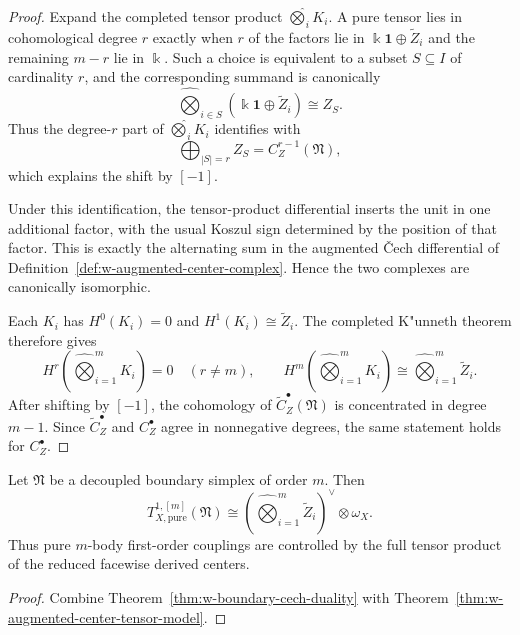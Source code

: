 \begin{proof}
Expand the completed tensor product $\widehat\bigotimes_i K_i$.  A pure tensor lies in cohomological
degree $r$ exactly when $r$ of the factors lie in $\Bbbk\mathbf{1}\oplus \widetilde Z_i$ and the remaining
$m-r$ lie in $\Bbbk$.  Such a choice is equivalent to a subset $S\subseteq I$ of cardinality $r$, and the
corresponding summand is canonically
\[
\widehat\bigotimes_{i\in S}(\Bbbk\mathbf{1}\oplus \widetilde Z_i)
\cong Z_S.
\]
Thus the degree-$r$ part of $\widehat\bigotimes_i K_i$ identifies with
\[
\bigoplus_{|S|=r} Z_S = C_Z^{r-1}(\mathfrak N),
\]
which explains the shift by $[-1]$.

Under this identification, the tensor-product differential inserts the unit in one additional factor, with
the usual Koszul sign determined by the position of that factor.  This is exactly the alternating sum in the
augmented \v{C}ech differential of Definition~\ref{def:w-augmented-center-complex}.  Hence the two complexes
are canonically isomorphic.

Each $K_i$ has $H^0(K_i)=0$ and $H^1(K_i)\cong \widetilde Z_i$.  The completed K"unneth theorem therefore gives
\[
H^r\left(\widehat\bigotimes_{i=1}^m K_i\right)=0\quad (r\neq m),
\qquad
H^m\left(\widehat\bigotimes_{i=1}^m K_i\right)
\cong
\widehat\bigotimes_{i=1}^m \widetilde Z_i.
\]
After shifting by $[-1]$, the cohomology of $\widetilde C_Z^\bullet(\mathfrak N)$ is concentrated in degree $m-1$.
Since $\widetilde C_Z^\bullet$ and $C_Z^\bullet$ agree in nonnegative degrees, the same statement holds for
$C_Z^\bullet$.
\end{proof}

\begin{corollary}
\label{cor:w-pure-mbody-coupling-theorem}
Let $\mathfrak N$ be a decoupled boundary simplex of order $m$.  Then
\[
T^{1,[m]}_{X,\mathrm{pure}}(\mathfrak N)
\cong
\left(\widehat\bigotimes_{i=1}^m \widetilde Z_i\right)^\vee\otimes \omega_X.
\]
Thus pure $m$-body first-order couplings are controlled by the full tensor product of the reduced
facewise derived centers.
\end{corollary}

\begin{proof}
Combine Theorem~\ref{thm:w-boundary-cech-duality} with
Theorem~\ref{thm:w-augmented-center-tensor-model}.
\end{proof}

